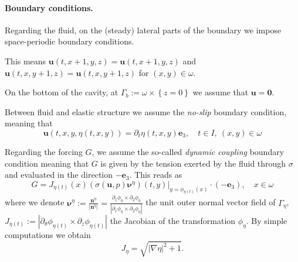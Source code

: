 \documentclass[10pt,a4paper]{article}
\numberwithin{equation}{section}
\begin{document}
\paragraph{Boundary conditions.}

Regarding the fluid, on the (steady) lateral parts of the boundary we impose space-periodic boundary conditions.

This means $\mathbf{u}\left(t,x+1,y,z\right)=\mathbf{u}\left(t,x+1,y,z\right)$ and $\mathbf{u}\left(t,x,y+1,z\right)=\mathbf{u}\left(t,x,y+1,z\right)$ for $(x,y)\in \omega$.

On the bottom of the cavity, at $\Gamma_{b}:=\omega\times\left\{ z=0\right\}$ we assume that $\mathbf{u}=\mathbf{0}$.

Between fluid and elastic structure we assume the \emph{no-slip} boundary condition, meaning that 
\begin{equation}
\mathbf{u}\left(t,x,y,\eta\left(t,x,y\right)\right)=\partial_{t}\eta\left(t,x,y\right)\mathbf{e}_{3},\quad t\in I,\ \left(x,y\right)\in\omega 
\end{equation}

Regarding the forcing $G$, we assume the so-called \emph{dynamic coupling} boundary condition meaning that $G$ is given by the tension exerted by the fluid through $\sigma$ and evaluated in the direction $-\mathbf{e}_{3}$. This reads as 
\begin{equation}\label{eqn:G-force}
G=J_{\eta\left(t\right)}\left(x\right)\left.\left(\sigma\left(\mathbf{u},p\right)\boldsymbol{\nu}^{\eta}\right)\left(t,y\right)\right|_{y=\phi_{\eta\left(t\right)}\left(x\right)}\cdot\left(-\mathbf{e}_{3}\right),\quad x\in\omega 
\end{equation}
where we denote $\boldsymbol{\nu}^{\eta}:=\frac{\mathbf{n}^{\eta}}{\left|\mathbf{n}^{\eta}\right|}=\frac{\partial_{1}\phi_{\eta}\times\partial_{2}\phi_{\eta}}{\left|\partial_{1}\phi_{\eta}\times\partial_{2}\phi_{\eta}\right|}$ the unit outer normal vector field of $\Gamma_{\eta}$, 
$J_{\eta\left(t\right)}:=\left|\partial_{\theta}\phi_{\eta\left(t\right)}\times\partial_{z}\phi_{\eta\left(t\right)}\right|$ the Jacobian of the transformation $\phi_{\eta}$.
By simple computations we obtain  
\begin{equation}\label{eqn:jacobian}
J_{\eta}=\sqrt{\left|\nabla\eta\right|^{2}+1}.
\end{equation}
 
\end{document}
